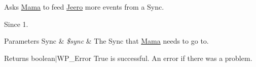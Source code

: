 Asks \hyperlink{namespaceJeero_1_1Mama}{Mama} to feed \hyperlink{namespaceJeero}{Jeero} more events from a Sync.

\begin{DoxySince}{Since}
1. 
\end{DoxySince}

\begin{DoxyParams}[1]{Parameters}
Sync & {\em \$sync} & The Sync that \hyperlink{namespaceJeero_1_1Mama}{Mama} needs to go to. \\
\hline
\end{DoxyParams}
\begin{DoxyReturn}{Returns}
boolean$\vert$\+W\+P\+\_\+\+Error True is successful. An error if there was a problem. 
\end{DoxyReturn}
